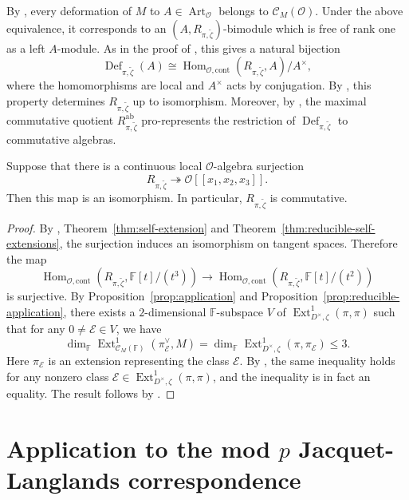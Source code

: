 \documentclass[11pt,a4paper]{article} %
\def\FF{\mathbb{F}}
\def\cC{\mathcal{C}}
\def\cE{\mathcal{E}}
\def\cO{\mathcal{O}}
\def\Art{\operatorname{Art}}
\def\dim{\operatorname{dim}}
\def\Ext{\operatorname{Ext}} %
\def\Hom{\operatorname{Hom}}
\begin{document}
By \cite[Lemma 3.22]{Pas13}, every deformation of $M$ to $A\in\Art_{\cO}$ belongs to $\cC_M(\cO)$. Under the above equivalence, it corresponds to an $(A,R_{\pi,\widetilde\zeta})$-bimodule which is free of rank one as a left $A$-module. As in the proof of \cite[Theorem 3.26]{Pas13}, this gives a natural bijection
\[
\operatorname{Def}_{\pi,\widetilde\zeta}(A)
\cong
\Hom_{\cO,\mathrm{cont}}(R_{\pi,\widetilde\zeta},A)/A^\times,
\]
where the homomorphisms are local and $A^\times$ acts by conjugation. By \cite[Lemma 3.31]{Pas13}, this property determines $R_{\pi,\widetilde\zeta}$ up to isomorphism. Moreover, by \cite[Corollary 3.27]{Pas13}, the maximal commutative quotient $R_{\pi,\widetilde\zeta}^{\mathrm{ab}}$
pro-represents the restriction of $\operatorname{Def}_{\pi,\widetilde\zeta}$ to commutative algebras.

\begin{proposition}\label{prop:deformation-commutativity}
    Suppose that there is a continuous local $\cO$-algebra surjection
    \[
    R_{\pi,\widetilde\zeta}\twoheadrightarrow
    \cO[[x_1,x_2,x_3]].
    \]
    Then this map is an isomorphism. In particular, $R_{\pi,\widetilde\zeta}$ is commutative.
\end{proposition}

\begin{proof}
    By \cite[Lemma 3.29]{Pas13}, Theorem~\ref{thm:self-extension} and Theorem~\ref{thm:reducible-self-extensions}, the surjection induces an isomorphism on tangent spaces. Therefore the map
    \[
    \Hom_{\cO,\mathrm{cont}}
    \left(R_{\pi,\widetilde\zeta},\FF[t]/(t^3)\right)
    \longrightarrow
    \Hom_{\cO,\mathrm{cont}}
    \left(R_{\pi,\widetilde\zeta},\FF[t]/(t^2)\right)
    \]
    is surjective. By Proposition~\ref{prop:application} and Proposition~\ref{prop:reducible-application}, there exists a $2$-dimensional $\FF$-subspace $V$ of $\Ext^1_{D^{\times},\zeta}(\pi,\pi)$ such that for any $0\ne\cE\in V$, we have 
    \[
    \dim_\FF\Ext^1_{\cC_M(\FF)}(\pi_\cE^\vee,M)
    =\dim_\FF\Ext^1_{D^\times,\zeta}(\pi,\pi_\cE)\le3.
    \]
    Here $\pi_\cE$ is an extension representing the class $\cE$. By \cite[Lemmas 3.42 and 3.43]{Pas13}, the same inequality holds for any nonzero class $\cE\in\Ext^1_{D^{\times},\zeta}(\pi,\pi)$, and the inequality is in fact an equality. The result follows by \cite[Theorem 3.39]{Pas13}.
\end{proof}

\section{Application to the mod \texorpdfstring{$p$}{p} Jacquet-Langlands correspondence}\label{sec:application}
\end{document}
